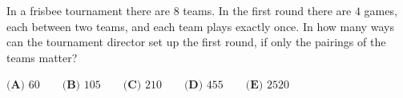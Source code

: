 In a frisbee tournament there are $8$ teams. In the first round there are $4$ games, each between two teams, and each team plays exactly once. In how many ways can the tournament director set up the first round, if only the pairings of the teams matter?

$\textbf{(A) }60\qquad\textbf{(B) }105\qquad\textbf{(C) }210\qquad\textbf{(D) }455\qquad\textbf{(E) }2520$
